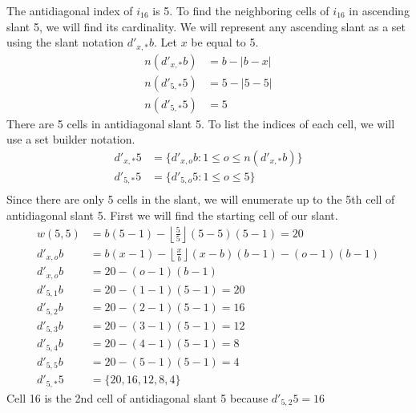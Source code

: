 \documentclass[twoside,openany,12pt]{book}
\begin{document}
    The antidiagonal index of $i_{16}$ is 5. To find the neighboring cells of $i_{16}$ in ascending slant 5, we will find its cardinality. We will represent any ascending slant as a set using the slant notation $d'_{x,*}b$. Let $x$ be equal to 5.
    \begin{equation*}
        \begin{split}
            n(d'_{x,*}b) &= b - |b - x| \\
            n(d'_{5,*}5) &= 5 - |5 - 5| \\
            n(d'_{5,*}5) &= 5
        \end{split}
    \end{equation*}
    There are 5 cells in antidiagonal slant 5. To list the indices of each cell, we will use a set builder notation.
    \begin{equation*}
        \begin{split}
            d'_{x,*}5 &= \{ d'_{x,o}b : 1 \leq o \leq n(d'_{x,*}b) \} \\
            d'_{5,*}5 &= \{ d'_{5,o}5 : 1 \leq o \leq 5 \} \\
        \end{split}
    \end{equation*}
    Since there are only 5 cells in the slant, we will enumerate up to the 5th cell of antidiagonal slant 5. First we will find the starting cell of our slant.
    \begin{equation*}
        \begin{split}
            w(5,5) &= b(5 - 1) - \left\lfloor \frac{5}{5} \right\rfloor(5 - 5)(5 - 1) = 20 \\
            d'_{x,o}b &= b(x - 1) - \left\lfloor \frac{x}{b} \right\rfloor(x - b)(b - 1) - (o-1)(b-1) \\
            d'_{x,o}b &= 20 - (o-1)(b-1) \\
            d'_{5,1}b &= 20 - (1-1)(5-1) = 20 \\
            d'_{5,2}b &= 20 - (2-1)(5-1) = 16\\
            d'_{5,3}b &= 20 - (3-1)(5-1) = 12\\
            d'_{5,4}b &= 20 - (4-1)(5-1) = 8\\
            d'_{5,5}b &= 20 - (5-1)(5-1) = 4\\
            d'_{5,*}5 &= \{20, 16, 12, 8, 4\}
        \end{split}
    \end{equation*}
    Cell 16 is the 2nd cell of antidiagonal slant 5 because $d'_{5,2}5 = 16$
\end{document}
